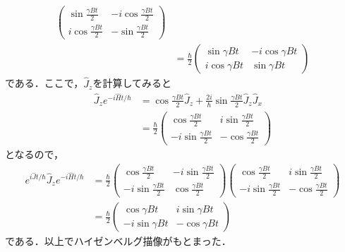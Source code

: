 \documentclass[a4paper,pdflatex,ja=standard]{bxjsarticle}
\begin{document}
\begin{enumerate}
\begin{align}
\begin{pmatrix}
      \sin\frac{\gamma Bt}{2} & -i\cos\frac{\gamma Bt}{2} \\
      i\cos\frac{\gamma Bt}{2} & -\sin\frac{\gamma Bt}{2}
    \end{pmatrix}
    \nonumber
    \\
    &=
    \frac{\hbar}{2}
    \begin{pmatrix}
      \sin \gamma Bt & -i\cos \gamma Bt \\
      i\cos \gamma Bt & \sin \gamma Bt
    \end{pmatrix}
  \end{align}
  である．ここで，$\hat{J}_{z}$を計算してみると
  \begin{align}
    \hat{J}_{z}e^{-i\hat{H}t/\hbar}
    &=
    \cos\frac{\gamma Bt}{2}
    \hat{J}_{z}
    +
    \frac{2i}{\hbar}
    \sin\frac{\gamma Bt}{2}
    \hat{J}_{z}\hat{J}_{x}
    \nonumber
    \\
    &=
    \frac{\hbar}{2}
    \begin{pmatrix}
      \cos\frac{\gamma Bt}{2} & i\sin\frac{\gamma Bt}{2} \\
      -i\sin\frac{\gamma Bt}{2} & -\cos\frac{\gamma Bt}{2} 
    \end{pmatrix}
  \end{align}
  となるので，
  \begin{align}
    e^{i\hat{J}t/\hbar}\hat{J}_{z}e^{-i\hat{H}t/\hbar}
    &=
    \frac{\hbar}{2}
    \begin{pmatrix}
      \cos\frac{\gamma Bt}{2} & -i\sin\frac{\gamma Bt}{2} \\
      -i\sin\frac{\gamma Bt}{2} & \cos\frac{\gamma Bt}{2} 
    \end{pmatrix}
    \begin{pmatrix}
      \cos\frac{\gamma Bt}{2} & i\sin\frac{\gamma Bt}{2} \\
      -i\sin\frac{\gamma Bt}{2} & -\cos\frac{\gamma Bt}{2} 
    \end{pmatrix}
    \nonumber
    \\
    &=
    \frac{\hbar}{2}
    \begin{pmatrix}
      \cos \gamma Bt & i\sin\gamma Bt \\
      -i\sin\gamma Bt & -\cos\gamma Bt
    \end{pmatrix}
  \end{align}
  である．以上でハイゼンベルグ描像がもとまった．


\end{enumerate}
\end{document}
